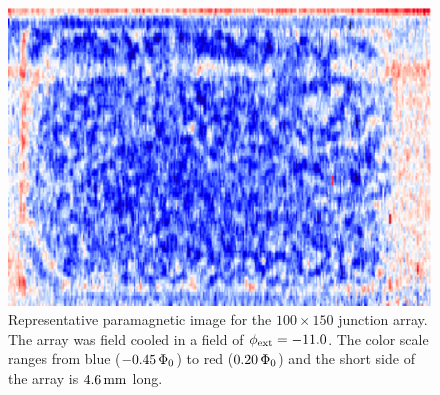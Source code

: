 
\begin{figure}[p]
\includegraphics[width=5.7in]{figs/pme_exp/fig3_9_a_lg.ps}
\caption[Representative paramagnetic image
for the $100\times 150$ junction array.]{Representative paramagnetic image
for the $100\times 150$ junction array. The array was field cooled
in a field of $\phi_{\mathrm{ext}} = -11.0$. The color scale ranges from blue
($-0.45\,\Phi_0$) to red ($0.20\,\Phi_0$) and the short side of
the array is $4.6\,\mathrm{mm}$ long. }
\label{fig:lg_paramag_image_a}
\end{figure}

